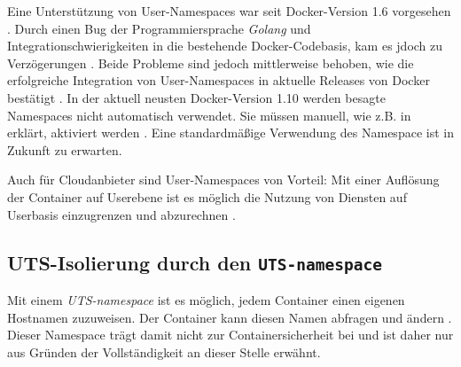 \documentclass[../main.tex]{subfiles}
\begin{document}
			Eine Unterstützung von User-Namespaces war seit Docker-Version 1.6 vorgesehen \cite{githubUserNamespaceProposal}. Durch einen Bug der Programmiersprache \emph{Golang} und Integrationschwierigkeiten in die bestehende Docker-Codebasis, kam es jdoch zu Verzögerungen \cite{nsUserGolangBug}\cite{githubUserNamespaceConflict}\cite{githubUserNamespaceIntegration}. Beide Probleme sind jedoch mittlerweise behoben, wie die erfolgreiche Integration von User-Namespaces in aktuelle Releases von Docker bestätigt \cite{githubUserNamespaceIntegration}. In der aktuell neusten Docker-Version 1.10 werden besagte Namespaces nicht automatisch verwendet. Sie müssen manuell, wie z.B. in \cite{nsUserEnable} erklärt, aktiviert werden \cite{githubDockerChangelog}. Eine standardmäßige Verwendung des Namespace ist in Zukunft zu erwarten.





			Auch für Cloudanbieter sind User-Namespaces von Vorteil: Mit einer Auflösung der Container auf Userebene ist es möglich die Nutzung von Diensten auf Userbasis einzugrenzen und abzurechnen \cite[S.3]{nsUserContainerCon}.

		\subsection{\acrshort{UTS}-Isolierung durch den \texttt{\acrshort{UTS}-namespace}}
			Mit einem \emph{\acrshort{UTS}-namespace} ist es möglich, jedem Container einen eigenen Hostnamen zuzuweisen. Der Container kann diesen Namen abfragen und ändern \cite[S.3]{virtVSContainer}. Dieser Namespace trägt damit nicht zur Containersicherheit bei und ist daher nur aus Gründen der Vollständigkeit an dieser Stelle erwähnt.
\end{document}
